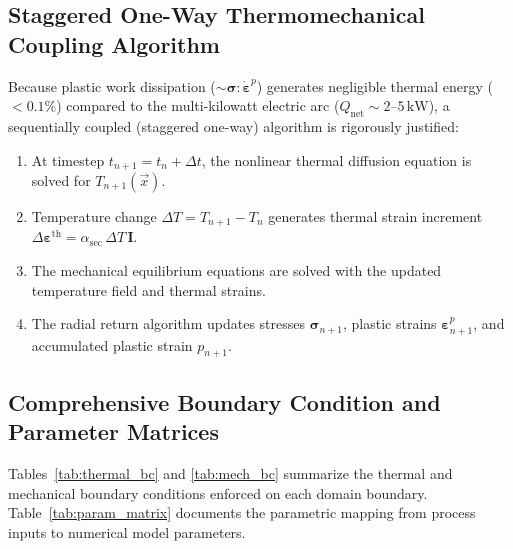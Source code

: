 \documentclass[10pt,a4paper]{article}
\begin{document}
\subsection{Staggered One-Way Thermomechanical Coupling Algorithm}
Because plastic work dissipation ($\sim \boldsymbol{\sigma} : \dot{\boldsymbol{\varepsilon}}^p$) generates negligible thermal energy ($< 0.1\%$) compared to the multi-kilowatt electric arc ($Q_{\mathrm{net}} \sim 2\text{--}5\,\mathrm{kW}$), a sequentially coupled (staggered one-way) algorithm is rigorously justified:
\begin{enumerate}
    \item At timestep $t_{n+1} = t_n + \Delta t$, the nonlinear thermal diffusion equation is solved for $T_{n+1}(\vec{x})$.
    \item Temperature change $\Delta T = T_{n+1} - T_n$ generates thermal strain increment $\Delta \boldsymbol{\varepsilon}^{\mathrm{th}} = \alpha_{\mathrm{sec}}\,\Delta T\,\mathbf{I}$.
    \item The mechanical equilibrium equations are solved with the updated temperature field and thermal strains.
    \item The radial return algorithm updates stresses $\boldsymbol{\sigma}_{n+1}$, plastic strains $\boldsymbol{\varepsilon}^p_{n+1}$, and accumulated plastic strain $p_{n+1}$.
\end{enumerate}

\subsection{Comprehensive Boundary Condition and Parameter Matrices}
Tables~\ref{tab:thermal_bc} and \ref{tab:mech_bc} summarize the thermal and mechanical boundary conditions enforced on each domain boundary. Table~\ref{tab:param_matrix} documents the parametric mapping from process inputs to numerical model parameters.
\end{document}

